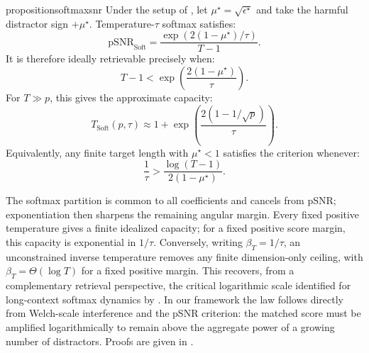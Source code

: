 \documentclass{article}
\newcommand{\1}{\bm{1}}
\def\eps{{\epsilon}}
\theoremstyle{definition}
\begin{document}
\begin{restatable}{proposition}{softmaxsnr}
  \label{prop:softmax-snr}
  Under the setup of , let
  $\mu^\star=\sqrt{\eps^\star}$ and take the harmful distractor sign
  $+\mu^\star$. Temperature-$\tau$ softmax satisfies:
  \begin{equation}
    \mathrm{pSNR}_{\mathrm{Soft}}
      =\frac{\exp(2(1-\mu^\star)/\tau)}{T-1}.
    \label{eq:softmax-psnr}
  \end{equation}
  It is therefore ideally retrievable precisely when:
  \begin{equation}
    T-1
    <\exp\!\left(\frac{2(1-\mu^\star)}{\tau}\right).
  \end{equation}
  For $T\gg p$, this gives the approximate capacity:
  \begin{equation}
    T_{\mathrm{Soft}}(p,\tau)
    \approx
    1+\exp\!\left(\frac{2(1-1/\sqrt p)}{\tau}\right).
    \label{eq:softmax-capacity-asymptotic}
  \end{equation}
  Equivalently, any finite target length with $\mu^\star<1$ satisfies the criterion whenever:
  \begin{equation}
    \frac{1}{\tau}
    >
    \frac{\log(T-1)}{2(1-\mu^\star)}.
    \label{eq:softmax-required-scale}
  \end{equation}
\end{restatable}

The softmax partition is common to all coefficients and cancels from pSNR; exponentiation then
sharpens the remaining angular margin. Every fixed positive temperature gives a finite idealized
capacity; for a fixed positive score margin, this capacity is exponential in $1/\tau$. Conversely,
writing $\beta_T=1/\tau$, an unconstrained inverse temperature removes any finite dimension-only
ceiling, with $\beta_T=\Theta(\log T)$ for a fixed positive margin.
This recovers, from a complementary retrieval perspective, the critical logarithmic scale identified
for long-context softmax dynamics by \citet{chen25longcontext}. In our framework the law follows
directly from Welch-scale interference and the pSNR criterion: the matched score must be amplified
logarithmically to remain above the aggregate power of a growing number of distractors. Proofs are
given in .

\end{document}
